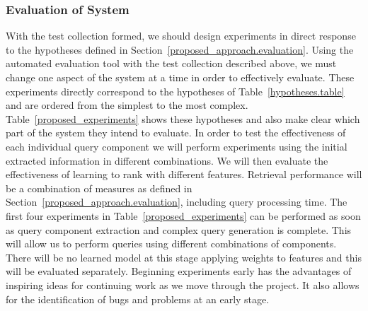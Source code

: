 \documentclass{mprop}
\begin{document}
\subsubsection{Evaluation of System}
With the test collection formed, we should design experiments in direct response to the hypotheses defined in Section~\ref{proposed_approach.evaluation}.
Using the automated evaluation tool with the test collection described above, we must change one aspect of the system at a time in order to effectively evaluate.
These experiments directly correspond to the hypotheses of Table~\ref{hypotheses.table} and are ordered from the simplest to the most complex. 
Table~\ref{proposed_experiments} shows these hypotheses and also make clear which part of the system they intend to evaluate.
In order to test the effectiveness of each individual query component we will perform experiments using the initial extracted information in different combinations.
We will then evaluate the effectiveness of learning to rank with different features.
Retrieval performance will be a combination of measures as defined in Section~\ref{proposed_approach.evaluation}, including query processing time.
The first four experiments in Table~\ref{proposed_experiments} can be performed as soon as query component extraction and complex query generation is complete. 
This will allow us to perform queries using different combinations of components. 
There will be no learned model at this stage applying weights to features and this will be evaluated separately.
Beginning experiments early has the advantages of inspiring ideas for continuing work as we move through the project.
It also allows for the identification of bugs and problems at an early stage.
\end{document}

